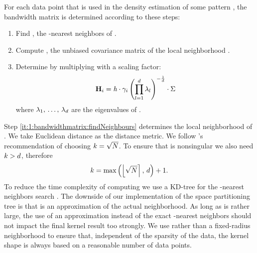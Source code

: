 	For each data point \varPattern[\itXis] that is used in the density estimation of some pattern \varPattern[\itXs], the bandwidth matrix is determined according to these steps:
		\begin{enumerate}[labelindent=0ex]
			\item \label{it:1:bandwidthmatrix:findNeighbours}
				Find \varNeighborhood{\varPattern[\itXis]}, the \KNNK-nearest neighbors of \varPattern[\itXis].
			\item \label{it:1:bandwidthmatrix:initialBandwidthMatrix}
				Compute \varCovarianceMatrix, the unbiased covariance matrix of the local neighborhood \varNeighborhood{\varPattern[\itXis]}.
			\item \label{it:1:bandwidthmatrix:scaleBandwidhtMatrix}
				Determine \varBandwidthMatrix[\itXis] by multiplying \varCovarianceMatrix with a scaling factor:
				\begin{equation}\label{eq:method:scalingFactor}
					\varBandwidthMatrix[\itXis] = \varBandwidth \cdot \varLocalBandwidth{\itXis}
				 \left( \displaystyle\prod_{\itDim = 1}^{\varDim} \varEigenValue_\itDim \right)^{-\frac{1}{\varDim}} \cdot \varCovarianceMatrix
				\end{equation}
				where $\lambda_1,\, \dotsc,\, \lambda_d$ are the eigenvalues of \varCovarianceMatrix.
		\end{enumerate}
		Step \ref{it:1:bandwidthmatrix:findNeighbours} determines the local neighborhood of \varPattern[\itXis]. We take Euclidean distance as the distance metric.
		We follow \citeauthor{silverman1986density}'s \cite{silverman1986density} recommendation of choosing $k = \sqrt{N}$. To ensure that \varCovarianceMatrix is nonsingular we also need $k > d$, therefore
		\begin{equation}\label{eq:method:k}
			k = \max\left(\left\lfloor \sqrt{N} \right\rceil,\, d \right) + 1.
		\end{equation}
		To reduce the time complexity of computing \varBandwidthMatrix[\itXis]we use a KD-tree for the \KNNK-nearest neighbors search \cite{Bentley1975Multidimensional}. The downside of our implementation of the space partitioning tree is that \varNeighborhood{\varPattern[\itXis]} is an approximation of the actual neighborhood. As long as \KNNK is rather large, the use of an approximation instead of the exact \KNNK-nearest neighbors should not impact the final kernel result too strongly.
		We use \KNN rather than a fixed-radius neighborhood to ensure that, independent of the sparsity of the data, the kernel shape is always based on a reasonable number of data points.

